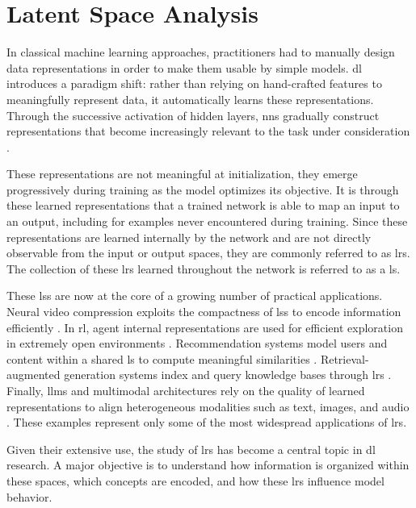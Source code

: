 \chapter{Latent Space Analysis}
\label{chap:latent_space}

\glsresetall

In classical machine learning approaches, practitioners had to manually design data representations in order to make them usable by simple models.
\gls{dl} introduces a paradigm shift: rather than relying on hand-crafted features to meaningfully represent data, it automatically learns these representations.
Through the successive activation of hidden layers, \glspl{nn} gradually construct representations that become increasingly relevant to the task under consideration \parencite{rumelhart1986learning}.

These representations are not meaningful at initialization, they emerge progressively during training as the model optimizes its objective.
It is through these learned representations that a trained network is able to map an input to an output, including for examples never encountered during training.
Since these representations are learned internally by the network and are not directly observable from the input or output spaces, they are commonly referred to as \glspl{lr}.
The collection of these \glspl{lr} learned throughout the network is referred to as a \gls{ls}.

These \glspl{ls} are now at the core of a growing number of practical applications.
Neural video compression exploits the compactness of \glspl{ls} to encode information efficiently \parencite{lu2019dvcendtoenddeepvideo}.
In \gls{rl}, agent internal representations are used for efficient exploration in extremely open environments \parencite{burda2018largescalestudycuriositydrivenlearning}.
Recommendation systems model users and content within a shared \gls{ls} to compute meaningful similarities \parencite{he2017neuralcollaborativefiltering}.
Retrieval-augmented generation systems index and query knowledge bases through \glspl{lr} \parencite{lewis2021retrievalaugmentedgenerationknowledgeintensivenlp}.
Finally, \glspl{llm} and multimodal architectures rely on the quality of learned representations to align heterogeneous modalities such as text, images, and audio \parencite{radford2021learningtransferablevisualmodels}.
These examples represent only some of the most widespread applications of \glspl{lr}.

Given their extensive use, the study of \glspl{lr} has become a central topic in \gls{dl} research.
A major objective is to understand how information is organized within these spaces, which concepts are encoded, and how these \glspl{lr} influence model behavior.

